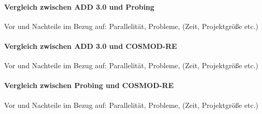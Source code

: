 \paragraph{Vergleich zwischen ADD 3.0 und Probing}
Vor und Nachteile im Bezug auf: Parallelität, Probleme, (Zeit, Projektgröße etc.)\\

\paragraph{Vergleich zwischen ADD 3.0 und  COSMOD-RE}
Vor und Nachteile im Bezug auf: Parallelität, Probleme, (Zeit, Projektgröße etc.)\\

\paragraph{Vergleich zwischen Probing und  COSMOD-RE}
Vor und Nachteile im Bezug auf: Parallelität, Probleme, (Zeit, Projektgröße etc.)\\
